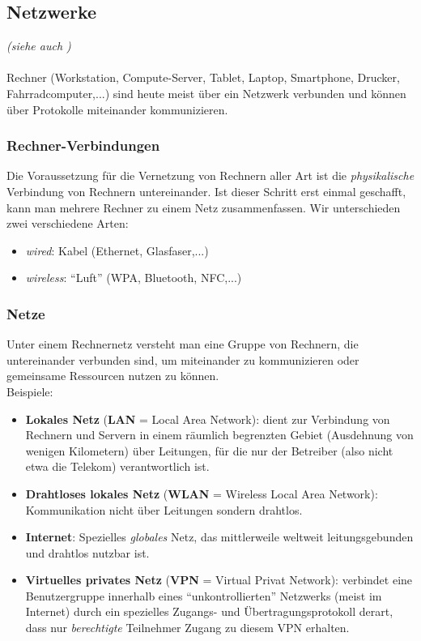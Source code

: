 \subsection{Netzwerke}
\textit{\small(siehe auch \cite[Kap. 3]{gumm2})}\\~\\
Rechner (Workstation, Compute-Server, Tablet, Laptop, Smartphone, Drucker, Fahrradcomputer,...) sind heute meist über ein Netzwerk verbunden und können über Protokolle miteinander kommunizieren.

\subsubsection{Rechner-Verbindungen}
Die Voraussetzung für die Vernetzung von Rechnern aller Art ist die \textit{physikalische} Verbindung von Rechnern untereinander. Ist dieser Schritt erst einmal geschafft, kann man
mehrere Rechner zu einem Netz zusammenfassen.
Wir unterschieden zwei verschiedene Arten:
\begin{itemize}
	\item \textit{wired}: Kabel (Ethernet, Glasfaser,...)
	\item \textit{wireless}: ``Luft'' (WPA, Bluetooth, NFC,...)
\end{itemize}
%
%
%
\subsubsection{Netze}
Unter einem Rechnernetz versteht man eine Gruppe von Rechnern, die untereinander
verbunden sind, um miteinander zu kommunizieren oder gemeinsame Ressourcen
nutzen zu können.\\ Beispiele:
\begin{itemize}
	\item \textbf{Lokales Netz} (\textbf{LAN} = Local Area Network): dient zur Verbindung von Rechnern
	und Servern in einem räumlich begrenzten Gebiet (Ausdehnung von wenigen Kilometern) über Leitungen, für die nur der Betreiber (also
	nicht etwa die Telekom) verantwortlich ist.
	\item \textbf{Drahtloses lokales Netz} (\textbf{WLAN} = Wireless Local Area
	Network): Kommunikation nicht über Leitungen sondern drahtlos.
	\item \textbf{Internet}: Spezielles \textit{globales} Netz, das mittlerweile weltweit leitungsgebunden und drahtlos nutzbar ist.
	\item \textbf{Virtuelles privates Netz} (\textbf{VPN} = Virtual Privat Network): verbindet eine Benutzergruppe innerhalb eines ``unkontrollierten'' Netzwerks (meist im Internet) durch ein spezielles Zugangs-	und Übertragungsprotokoll derart, dass nur \textit{berechtigte} Teilnehmer Zugang zu diesem VPN erhalten.
\end{itemize}

